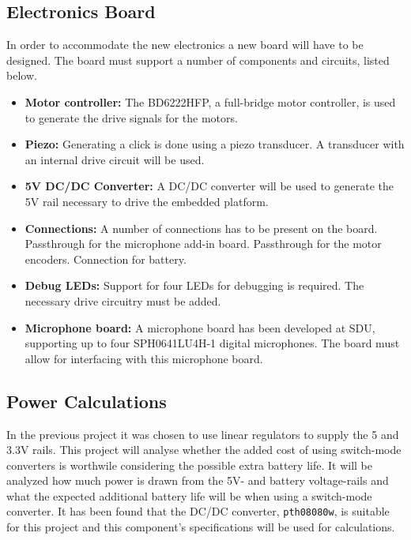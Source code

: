 \subsection{Electronics Board} %
\label{sub:electronics_board}
In order to accommodate the new electronics a new board will have to be designed.
The board must support a number of components and circuits, listed below.
\begin{itemize}
	\item \textbf{Motor controller:} The BD6222HFP, a full-bridge motor controller, is used to generate the drive signals for the motors.
	\item \textbf{Piezo:} Generating a click is done using a piezo transducer.
	A transducer with an internal drive circuit will be used.
	\item \textbf{5V DC/DC Converter:} A DC/DC converter will be used to generate the 5V rail necessary to drive the embedded platform.
	\item \textbf{Connections:} A number of connections has to be present on the board.
	Passthrough for the microphone add-in board.
	Passthrough for the motor encoders.
	Connection for battery.
	\item \textbf{Debug LEDs:} Support for four LEDs for debugging is required.
	The necessary drive circuitry must be added.
	\item \textbf{Microphone board:} A microphone board has been developed at SDU, supporting up to four SPH0641LU4H-1 digital microphones. The board must allow for interfacing with this microphone board.
\end{itemize}


\subsection{Power Calculations} %
\label{sub:power_calculations}
In the previous project it was chosen to use linear regulators to supply the 5 and 3.3V rails.
This project will analyse whether the added cost of using switch-mode converters is worthwile considering the possible extra battery life.
It will be analyzed how much power is drawn from the 5V- and battery voltage-rails and what the expected additional battery life will be when using a switch-mode converter.
It has been found that the DC/DC converter, \texttt{pth08080w}, is suitable for this project and this component's specifications will be used for calculations. 

